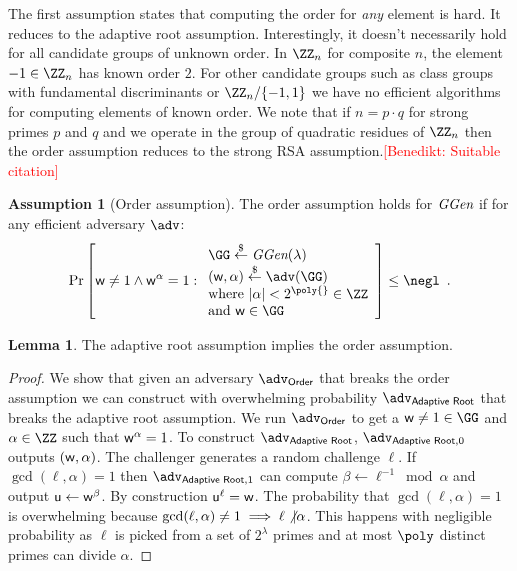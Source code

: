 \documentclass{article}
\theoremstyle{definition}
\newtheorem{lemma}{Lemma}
\newtheorem{assumption}{Assumption}
\newcommand{\benedikt}[1]{{\textcolor{red}{[Benedikt: #1]}}}
\newcommand{\benedikt}[1]{}
\begin{document}
The first assumption states that computing the order for \emph{any} element is hard. It reduces to the adaptive root assumption. Interestingly, it doesn't necessarily hold for all candidate groups of unknown order. In $\ZZ_n$ for composite $n$, the element $-1\in \ZZ_n$ has known order $2$. For other candidate groups such as class groups with fundamental discriminants or $\ZZ_n/\{-1,1\}$ we have no efficient algorithms for computing elements of known order. We note that if $n=p\cdot q$ for strong primes $p$ and $q$ and we operate in the group of quadratic residues of $\ZZ_n$ then the order assumption reduces to the strong RSA assumption.\benedikt{Suitable citation}
\begin{assumption}[Order assumption]
\label{assum:order}
	The order assumption holds for $\textit{GGen}$ if for any efficient adversary $\adv$:
\[        
                \Pr\left[\gr{w}\neq 1 \wedge \gr{w}^{\alpha}= 1: 
                \begin{array}{l} 
                      \GG \sample \ggen(\lambda) \\ 
                      (\gr{w},\alpha) \sample \adv(\GG) \\
                      \text{where } |\alpha|<2^{\poly{}}\in \ZZ\\
                      \text{and } \gr{w}\in \GG
                \end{array} 
        \right] \leq \negl \enspace .
\]
\end{assumption}
\begin{lemma}
\label{lem:ordertoadaptive}
	The adaptive root assumption implies the order assumption.
\end{lemma}
\begin{proof}
	We show that given an adversary $\adv_{\textsf{Order}}$ that breaks the order assumption we can construct with overwhelming probability $\adv_{\textsf{Adaptive Root}}$ that breaks the adaptive root assumption. We run $\adv_{\textsf{Order}}$ to get a $\gr{w}\neq 1\in \GG$ and $\alpha \in \ZZ$ such that $\mathsf{w}^{\alpha}=1$. To construct $\adv_{\textsf{Adaptive Root}}$, $\adv_{\textsf{Adaptive Root},0}$ outputs $(\mathsf{w},\alpha)$. The challenger generates a random challenge $\ell$. If $\gcd(\ell,\alpha)=1$ then $\adv_{\textsf{Adaptive Root},1}$ can compute $\beta\gets \ell^{-1} \bmod \alpha$ and output $\mathsf{u}\gets\mathsf{w}^{\beta}$. By construction $\mathsf{u}^{\ell}=\mathsf{w}$. The probability that $\gcd(\ell,\alpha)=1$ is overwhelming because $\gcd(\ell,\alpha)\neq 1 \implies \ell \not\vert \alpha$. This happens with negligible probability as $\ell$ is picked from a set of $2^\lambda$ primes and at most $\poly$ distinct primes can divide $\alpha$.
	\end{proof}
	
\end{document}
